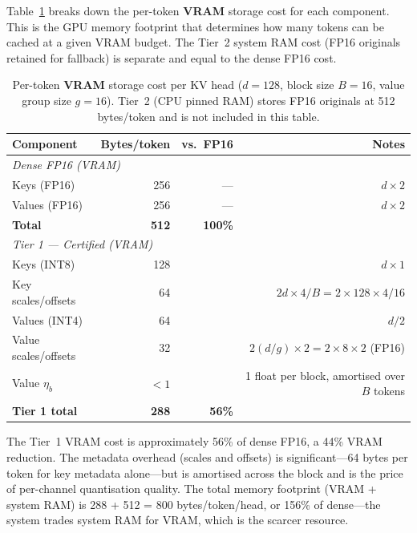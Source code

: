 \documentclass[10pt,twocolumn,a4paper]{article}
\theoremstyle{definition}
\theoremstyle{remark}
\begin{document}
Table~\ref{tab:storage} breaks down the per-token \textbf{VRAM} storage cost for each component.  This is the GPU memory footprint that determines how many tokens can be cached at a given VRAM budget.  The Tier~2 system RAM cost (FP16 originals retained for fallback) is separate and equal to the dense FP16 cost.

\begin{table}[!t]
\centering
\caption{Per-token \textbf{VRAM} storage cost per KV head ($d{=}128$, block size $B{=}16$, value group size $g{=}16$).  Tier~2 (CPU pinned RAM) stores FP16 originals at 512 bytes/token and is not included in this table.}
\label{tab:storage}
\small
\begin{tabular}{lrrr}
\toprule
\textbf{Component} & \textbf{Bytes/token} & \textbf{vs.\ FP16} & \textbf{Notes} \\
\midrule
\multicolumn{4}{l}{\emph{Dense FP16 (VRAM)}} \\
Keys (FP16)   & 256 & --- & $d \times 2$ \\
Values (FP16) & 256 & --- & $d \times 2$ \\
\textbf{Total} & \textbf{512} & \textbf{100\%} & \\
\midrule
\multicolumn{4}{l}{\emph{Tier 1 --- Certified (VRAM)}} \\
Keys (INT8)        & 128 & & $d \times 1$ \\
Key scales/offsets & 64  & & $2d \times 4 / B = 2 \times 128 \times 4 / 16$ \\
Values (INT4)      & 64  & & $d / 2$ \\
Value scales/offsets & 32  & & $2(d/g) \times 2 = 2 \times 8 \times 2$ (FP16) \\
Value $\eta_b$     & $<1$ & & 1 float per block, amortised over $B$ tokens \\
\textbf{Tier 1 total} & \textbf{288} & \textbf{56\%} & \\
\bottomrule
\end{tabular}
\end{table}

The Tier~1 VRAM cost is approximately 56\% of dense FP16, a 44\% VRAM reduction.  The metadata overhead (scales and offsets) is significant---64 bytes per token for key metadata alone---but is amortised across the block and is the price of per-channel quantisation quality.  The total memory footprint (VRAM + system RAM) is 288 + 512 = 800 bytes/token/head, or 156\% of dense---the system trades system RAM for VRAM, which is the scarcer resource.
\end{document}
